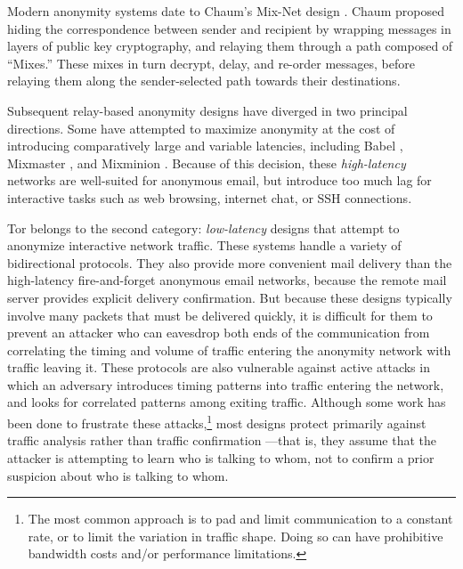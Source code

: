 \documentclass[times,10pt,twocolumn]{article}
\begin{document}

\label{sec:related-work}

Modern anonymity systems date to Chaum's Mix-Net design
\cite{chaum-mix}. Chaum
proposed hiding the correspondence between sender and recipient by
wrapping messages in layers of public key cryptography, and relaying them
through a path composed of ``Mixes.''  These mixes in turn decrypt, delay,
and re-order messages, before relaying them along the sender-selected
path towards their destinations.

Subsequent relay-based anonymity designs have diverged in two
principal directions.  Some have attempted to maximize anonymity at
the cost of introducing comparatively large and variable latencies,
including Babel \cite{babel}, Mixmaster \cite{mixmaster-spec}, and
Mixminion \cite{minion-design}.  Because of this
decision, these \emph{high-latency} networks are well-suited for anonymous
email, but introduce too much lag for interactive tasks such as web browsing,
internet chat, or SSH connections.

Tor belongs to the second category: \emph{low-latency} designs that
attempt to anonymize interactive network traffic. These systems handle
a variety of bidirectional protocols. They also provide more convenient
mail delivery than the high-latency fire-and-forget anonymous email
networks, because the remote mail server provides explicit delivery
confirmation. But because these designs typically
involve many packets that must be delivered quickly, it is
difficult for them to prevent an attacker who can eavesdrop both ends of the
communication from correlating the timing and volume
of traffic entering the anonymity network with traffic leaving it.  These
protocols are also vulnerable against active attacks in which an
adversary introduces timing patterns into traffic entering the network, and 
looks
for correlated patterns among exiting traffic.
Although some work has been done to frustrate
these attacks,\footnote{
  The most common approach is to pad and limit communication to a constant
  rate, or to limit
  the variation in traffic shape.  Doing so can have prohibitive bandwidth
  costs and/or performance limitations.
} most designs protect primarily against traffic analysis rather than traffic
confirmation \cite{or-jsac98}---that is, they assume that the attacker is
attempting to learn who is talking to whom, not to confirm a prior suspicion
about who is talking to whom.
\end{document}
